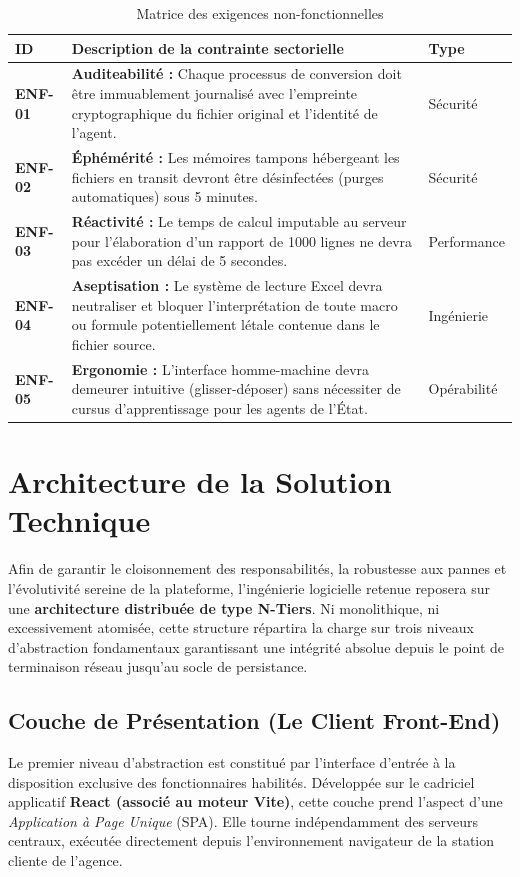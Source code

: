 \documentclass[12pt,a4paper,twoside]{report}
\begin{document}
\begin{table}[h]
\centering
\renewcommand{\arraystretch}{1.5}
\begin{tabular}{@{} p{2cm} p{10cm} p{2.5cm} @{}}
\toprule
\textbf{ID} & \textbf{Description de la contrainte sectorielle} & \textbf{Type} \\
\midrule
\textbf{ENF-01} & \textbf{Auditeabilité :} Chaque processus de conversion doit être immuablement journalisé avec l'empreinte cryptographique du fichier original et l'identité de l'agent. & Sécurité \\
\textbf{ENF-02} & \textbf{Éphémérité :} Les mémoires tampons hébergeant les fichiers en transit devront être désinfectées (purges automatiques) sous 5 minutes. & Sécurité \\
\textbf{ENF-03} & \textbf{Réactivité :} Le temps de calcul imputable au serveur pour l'élaboration d'un rapport de 1000 lignes ne devra pas excéder un délai de 5 secondes. & Performance \\
\textbf{ENF-04} & \textbf{Aseptisation :} Le système de lecture Excel devra neutraliser et bloquer l'interprétation de toute macro ou formule potentiellement létale contenue dans le fichier source. & Ingénierie \\
\textbf{ENF-05} & \textbf{Ergonomie :} L'interface homme-machine devra demeurer intuitive (glisser-déposer) sans nécessiter de cursus d'apprentissage pour les agents de l'État. & Opérabilité \\
\bottomrule
\end{tabular}
\caption{Matrice des exigences non-fonctionnelles}
\end{table}


\chapter{Architecture de la Solution Technique}

Afin de garantir le cloisonnement des responsabilités, la robustesse aux pannes et l'évolutivité sereine de la plateforme, l'ingénierie logicielle retenue reposera sur une \textbf{architecture distribuée de type N-Tiers}. Ni monolithique, ni excessivement atomisée, cette structure répartira la charge sur trois niveaux d'abstraction fondamentaux garantissant une intégrité absolue depuis le point de terminaison réseau jusqu'au socle de persistance.

\section{Couche de Présentation (Le Client Front-End)}
Le premier niveau d'abstraction est constitué par l'interface d'entrée à la disposition exclusive des fonctionnaires habilités. Développée sur le cadriciel applicatif \textbf{React (associé au moteur Vite)}, cette couche prend l'aspect d'une \textit{Application à Page Unique} (SPA). Elle tourne indépendamment des serveurs centraux, exécutée directement depuis l'environnement navigateur de la station cliente de l'agence.
\end{document}
